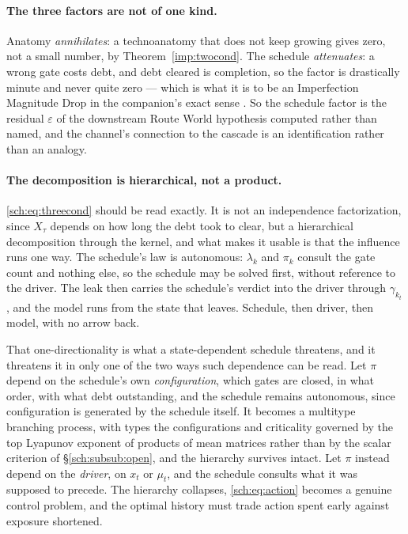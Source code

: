 \paragraph{The three factors are not of one kind.}\label{sch:rem:threefactor}
Anatomy \emph{annihilates}: a technoanatomy that does not keep growing gives zero, not a small number,
by Theorem~\ref{imp:twocond}. The schedule \emph{attenuates}: a
wrong gate costs debt, and debt cleared is completion, so the factor is
drastically minute and never quite zero --- which is what it is to be an
Imperfection Magnitude Drop in the companion's exact sense \cite{Nexus}.
So the schedule factor is the residual $\varepsilon$ of
the downstream Route World hypothesis computed rather than named, and the
channel's connection to the cascade is an identification rather than an
analogy.

\paragraph{The decomposition is hierarchical, not a product.}\label{sch:rem:hierarchical}
\eqref{sch:eq:threecond} should be read exactly. It is not an
independence factorization, since $X_\tau$ depends on how long the debt
took to clear, but a hierarchical decomposition through the kernel, and
what makes it usable is that the influence runs one way. The schedule's law is autonomous: $\lambda_k$
and $\pi_k$ consult the gate count and nothing else, so the schedule may
be solved first, without reference to the driver. The leak then carries
the schedule's verdict into the driver through $\gamma_{k_t}$, and the
model runs from the state that leaves. Schedule, then driver, then
model, with no arrow back.

That one-directionality is what a state-dependent schedule threatens,
and it threatens it in only one of the two ways such dependence can be
read. Let $\pi$ depend on the schedule's own \emph{configuration}, which gates are closed, in what order, with what debt outstanding, and the schedule remains autonomous, since configuration is generated by
the schedule itself. It becomes a multitype branching process, with
types the configurations and criticality governed by the top Lyapunov
exponent of products of mean matrices rather than by the scalar
criterion of \S\ref{sch:subsub:open}, and the hierarchy survives intact.
Let $\pi$ instead depend on the \emph{driver}, on $x_t$ or $\mu_t$, and the schedule consults what it was supposed to precede. The
hierarchy collapses, \eqref{sch:eq:action} becomes a genuine control
problem, and the optimal history must trade action spent early against
exposure shortened.

